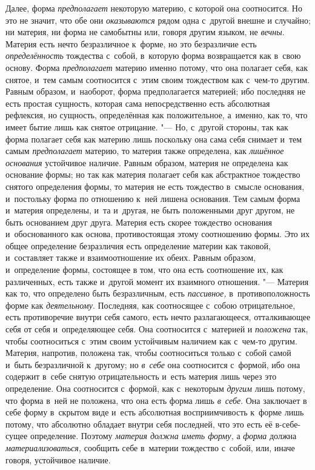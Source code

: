 Далее, форма {\em предполагает} некоторую материю, с
которой она соотносится. Но это не значит, что обе они
{\em оказываются} рядом одна с~другой внешне и
случайно; ни материя, ни форма не самобытны или, говоря другим языком, не
{\em вечны}. Материя есть нечто безразличное к~форме,
но это безразличие есть {\em определённость} тождества
с~собой, в~которую форма возвращается как в~свою основу. Форма
{\em предполагает} материю именно потому, что она
полагает себя, как снятое, и~тем самым соотносится с~этим своим тождеством
как с~чем-то другим. Равным образом, и~наоборот, форма предполагается
материей; ибо последняя не есть простая сущность, которая сама
непосредственно есть абсолютная рефлексия, но сущность, определённая как
положительное, а~именно, как то, что имеет бытие лишь как снятое отрицание.
"--- Но, с~другой стороны, так как форма полагает себя как материю лишь
поскольку она сама себя снимает и~тем самым
{\em предполагает} материю, то материя также
определена, как {\em лишённое основания} устойчивое
наличие. Равным образом, материя не определена как основание формы; но так
как материя полагает себя как абстрактное тождество снятого определения
формы, то материя не есть тождество в~смысле основания, и~постольку форма
по отношению к~ней лишена основания. Тем самым форма и~материя определены,
и~та и~другая, не быть положенными друг другом, не быть основанием друг
друга. Материя есть скорее тождество основания и~обоснованного как основа,
противостоящая этому соотношению формы. Это их общее определение
безразличия есть определение материи как таковой, и~составляет также и
взаимоотношение их обеих. Равным образом, и~определение формы, состоящее в
том, что она есть соотношение их, как различенных, есть также и~другой
момент их взаимного отношения. "--- Материя как то, что определено быть
безразличным, есть {\em пассивное,} в~противоположность
форме как {\em деятельному}. Последняя, как соотносящее
с~собою отрицательное, есть противоречие внутри себя самого, есть нечто
разлагающееся, отталкивающее себя от себя и~определяющее себя. Она
соотносится с~материей и {\em положена} так, чтобы
соотноситься с~этим своим устойчивым наличием как с~чем-то другим. Материя,
напротив, положена так, чтобы соотноситься только с~собой самой и~быть
безразличной к~другому; но {\em в~себе} она соотносится
с~формой, ибо она содержит в~себе снятую отрицательность и~есть материя
лишь через это определение. Она соотносится с~формой, как с~некоторым
{\em другим} лишь потому, что форма в~ней не положена,
что она есть форма лишь {\em в~себе}. Она заключает в
себе форму в~скрытом виде и~есть абсолютная восприимчивость к~форме лишь
потому, что абсолютно обладает внутри себя последней, что это есть её
в-себе-сущее определение. Поэтому {\em материя должна
иметь форму,} а {\em форма} должна
{\em материализоваться,} сообщить себе в~материи
тождество с~собой, или, иначе говоря, устойчивое наличие.

